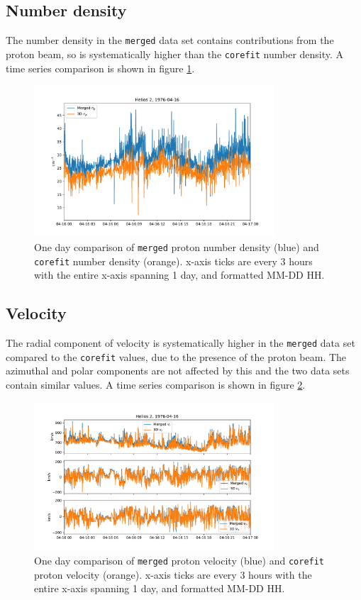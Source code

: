\documentclass[11pt,a4paper]{article}
\begin{document}
\subsection{Number density}
The number density in the \texttt{merged} data set contains contributions from the proton beam, so is systematically higher than the \texttt{corefit} number density. A time series comparison is shown in figure \ref{fig:density}.
\begin{figure}
	\centering
	\includegraphics[width=0.8\textwidth]{density_comparison}
	\caption{One day comparison of \texttt{merged} proton number density (blue) and \texttt{corefit} number density (orange). x-axis ticks are every 3 hours with the entire x-axis spanning 1 day, and formatted MM-DD HH.}
	\label{fig:density}
\end{figure}

\subsection{Velocity}
The radial component of velocity is systematically higher in the \texttt{merged} data set compared to the \texttt{corefit} values, due to the presence of the proton beam. The azimuthal and polar components are not affected by this and the two data sets contain similar values. A time series comparison is shown in figure \ref{fig:velocity}.
\begin{figure}
	\centering
	\includegraphics[width=0.8\textwidth]{velocity_comparison}
	\caption{One day comparison of \texttt{merged} proton velocity (blue) and \texttt{corefit} proton velocity (orange). x-axis ticks are every 3 hours with the entire x-axis spanning 1 day, and formatted MM-DD HH.}
	\label{fig:velocity}
\end{figure}
\end{document}
